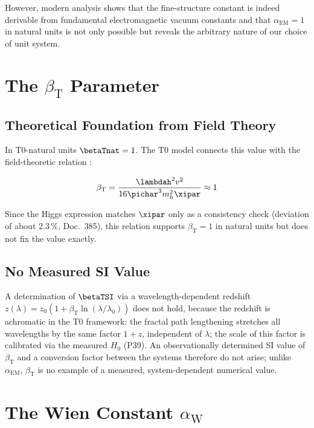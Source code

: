 However, modern analysis shows that the fine-structure constant is indeed derivable from fundamental electromagnetic vacuum constants and that $\alpha_{\text{EM}} = 1$ in natural units is not only possible but reveals the arbitrary nature of our choice of unit system.
	\section{The $\beta_{\text{T}}$ Parameter}
	\label{sec:beta_t}
	
	\subsection{Theoretical Foundation from Field Theory}
	\label{subsec:beta_field_theory}
	
	In T0-natural units $\betaTnat = 1$. The T0 model connects this value with the field-theoretic relation \cite{pascher_derivation_beta_2025}:
	
	\begin{equation}
		\beta_{\text{T}} = \frac{\lambdah^2 v^2}{16\pichar^3 m_h^2 \xipar} \approx 1
		\label{eq:beta_t_field_theory}
	\end{equation}
	
	Since the Higgs expression matches $\xipar$ only as a consistency check (deviation of about $2.3\,\%$, Doc.~385), this relation supports $\beta_{\text{T}} = 1$ in natural units but does not fix the value exactly.
	
	\subsection{No Measured SI Value}
	\label{subsec:beta_circularity}
	
	A determination of $\betaTSI$ via a wavelength-dependent redshift $z(\lambda) = z_0\left(1 + \beta_{\text{T}} \ln(\lambda/\lambda_0)\right)$ does not hold, because the redshift is achromatic in the T0 framework: the fractal path lengthening stretches all wavelengths by the same factor $1+z$, independent of $\lambda$; the scale of this factor is calibrated via the measured $H_0$ (P39). An observationally determined SI value of $\beta_{\text{T}}$ and a conversion factor between the systems therefore do not arise; unlike $\alpha_{\text{EM}}$, $\beta_{\text{T}}$ is no example of a measured, system-dependent numerical value.
	
	\section{The Wien Constant $\alpha_{\text{W}}$}
	\label{sec:alpha_w}
	
